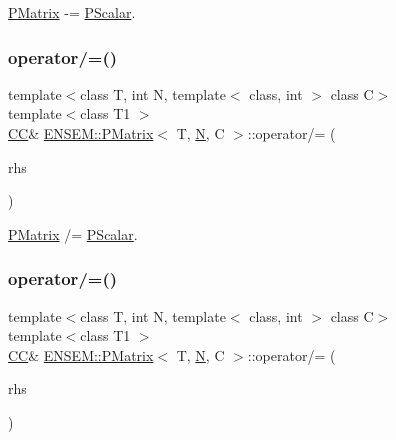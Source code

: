 \mbox{\hyperlink{classENSEM_1_1PMatrix}{P\+Matrix}} -\/= \mbox{\hyperlink{classENSEM_1_1PScalar}{P\+Scalar}}. 

\mbox{\label{classENSEM_1_1PMatrix_ade8246cb542a62e3368d33026885ca59}} 
\subsubsection{\texorpdfstring{operator/=()}{operator/=()}\hspace{0.1cm}{\footnotesize\ttfamily [1/2]}}
{\footnotesize\ttfamily template$<$class T, int N, template$<$ class, int $>$ class C$>$ \\
template$<$class T1 $>$ \\
\mbox{\hyperlink{classENSEM_1_1PMatrix_a744bac549029029effe32dc1705660ec}{CC}}\& \mbox{\hyperlink{classENSEM_1_1PMatrix}{E\+N\+S\+E\+M\+::\+P\+Matrix}}$<$ T, \mbox{\hyperlink{operator__name__util_8cc_a7722c8ecbb62d99aee7ce68b1752f337}{N}}, C $>$\+::operator/= (\begin{DoxyParamCaption}\item[{const \mbox{\hyperlink{classENSEM_1_1PScalar}{P\+Scalar}}$<$ T1 $>$ \&}]{rhs }\end{DoxyParamCaption})\hspace{0.3cm}{\ttfamily [inline]}}



\mbox{\hyperlink{classENSEM_1_1PMatrix}{P\+Matrix}} /= \mbox{\hyperlink{classENSEM_1_1PScalar}{P\+Scalar}}. 

\mbox{\label{classENSEM_1_1PMatrix_ade8246cb542a62e3368d33026885ca59}} 
\subsubsection{\texorpdfstring{operator/=()}{operator/=()}\hspace{0.1cm}{\footnotesize\ttfamily [2/2]}}
{\footnotesize\ttfamily template$<$class T, int N, template$<$ class, int $>$ class C$>$ \\
template$<$class T1 $>$ \\
\mbox{\hyperlink{classENSEM_1_1PMatrix_a744bac549029029effe32dc1705660ec}{CC}}\& \mbox{\hyperlink{classENSEM_1_1PMatrix}{E\+N\+S\+E\+M\+::\+P\+Matrix}}$<$ T, \mbox{\hyperlink{operator__name__util_8cc_a7722c8ecbb62d99aee7ce68b1752f337}{N}}, C $>$\+::operator/= (\begin{DoxyParamCaption}\item[{const \mbox{\hyperlink{classENSEM_1_1PScalar}{P\+Scalar}}$<$ T1 $>$ \&}]{rhs }\end{DoxyParamCaption})\hspace{0.3cm}{\ttfamily [inline]}}



